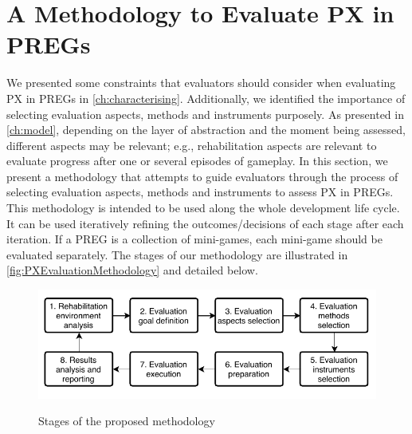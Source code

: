 \chapter{A Methodology to Evaluate PX in \acp{PREG}}
\label{ch:methodology}
We presented some constraints that evaluators should consider when evaluating \ac{PX} in \acp{PREG} in \autoref{ch:characterising}. Additionally, we identified the importance of selecting evaluation aspects, methods and instruments purposely. As presented in \autoref{ch:model}, depending on the layer of abstraction and the moment being assessed, different aspects may be relevant; e.g., rehabilitation aspects are relevant to evaluate progress after one or several episodes of gameplay. In this section, we present a methodology that attempts to guide evaluators through the process of selecting evaluation aspects, methods and instruments to assess \ac{PX} in \acp{PREG}. This methodology is intended to be used along the whole development life cycle. It can be used iteratively refining the outcomes/decisions of each stage after each iteration. If a \ac{PREG} is a collection of mini-games, each mini-game should be evaluated separately. The stages of our methodology are illustrated in \autoref{fig:PXEvaluationMethodology} and detailed below.

\begin{figure}[bth]
\myfloatalign
{\includegraphics[width=\linewidth]{gfx/methodology/PXEvaluationMethodology}} \quad
\caption{Stages of the proposed methodology}\label{fig:PXEvaluationMethodology}
\end{figure}




